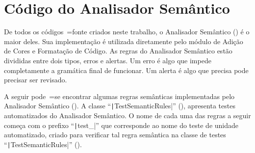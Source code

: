\chapter[Analisador Semântico]{Código do Analisador Semântico}

De todos os códigos~=fonte criados neste trabalho,
o Analisador Semântico () é o maior deles.
Sua implementação é utilizada diretamente pelo módulo de Adição de Cores e
Formatação de Código.
As regras do Analisador Semântico estão divididas entre dois tipos,
erros e
alertas.
Um erro é algo que impede completamente a gramática final de funcionar.
Um alerta é algo que precisa pode precisar ser revisado.

A seguir pode~=se encontrar algumas regras semânticas implementadas pelo Analisador Semântico ().
A classe ``\texttt|TestSemanticRules|'' (),
apresenta testes automatizados do Analisador Semântico.
O nome de cada uma das regras a seguir começa com o prefixo ``\texttt|test_|'' que corresponde ao nome do teste de unidade automatizado,
criado para verificar tal regra semântica na classe de testes ``\texttt|TestSemanticRules|'' ().
